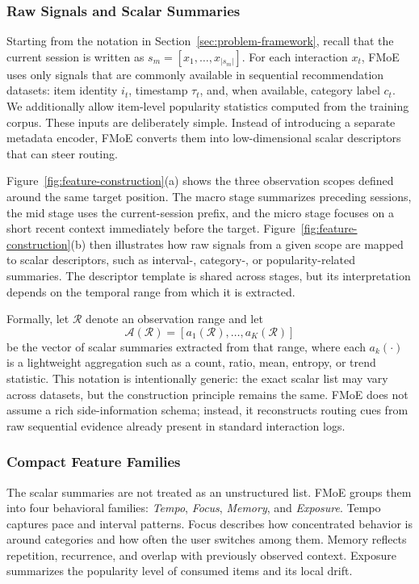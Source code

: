 \documentclass[sigconf,anonymous,review]{acmart}
\begin{document}
\subsubsection{Raw Signals and Scalar Summaries}

Starting from the notation in Section~\ref{sec:problem-framework}, recall that the current session is written as $s_m = [x_1, \dots, x_{|s_m|}]$. For each interaction $x_t$, FMoE uses only signals that are commonly available in sequential recommendation datasets: item identity $i_t$, timestamp $\tau_t$, and, when available, category label $c_t$. We additionally allow item-level popularity statistics computed from the training corpus. These inputs are deliberately simple. Instead of introducing a separate metadata encoder, FMoE converts them into low-dimensional scalar descriptors that can steer routing.

Figure~\ref{fig:feature-construction}(a) shows the three observation scopes defined around the same target position. The macro stage summarizes preceding sessions, the mid stage uses the current-session prefix, and the micro stage focuses on a short recent context immediately before the target. Figure~\ref{fig:feature-construction}(b) then illustrates how raw signals from a given scope are mapped to scalar descriptors, such as interval-, category-, or popularity-related summaries. The descriptor template is shared across stages, but its interpretation depends on the temporal range from which it is extracted.

Formally, let $\mathcal{R}$ denote an observation range and let
\[
\mathcal{A}(\mathcal{R}) = [a_1(\mathcal{R}), \dots, a_K(\mathcal{R})]
\]
be the vector of scalar summaries extracted from that range, where each $a_k(\cdot)$ is a lightweight aggregation such as a count, ratio, mean, entropy, or trend statistic. This notation is intentionally generic: the exact scalar list may vary across datasets, but the construction principle remains the same. FMoE does not assume a rich side-information schema; instead, it reconstructs routing cues from raw sequential evidence already present in standard interaction logs.

\subsubsection{Compact Feature Families}

The scalar summaries are not treated as an unstructured list. FMoE groups them into four behavioral families: \textit{Tempo}, \textit{Focus}, \textit{Memory}, and \textit{Exposure}. Tempo captures pace and interval patterns. Focus describes how concentrated behavior is around categories and how often the user switches among them. Memory reflects repetition, recurrence, and overlap with previously observed context. Exposure summarizes the popularity level of consumed items and its local drift.
\end{document}
